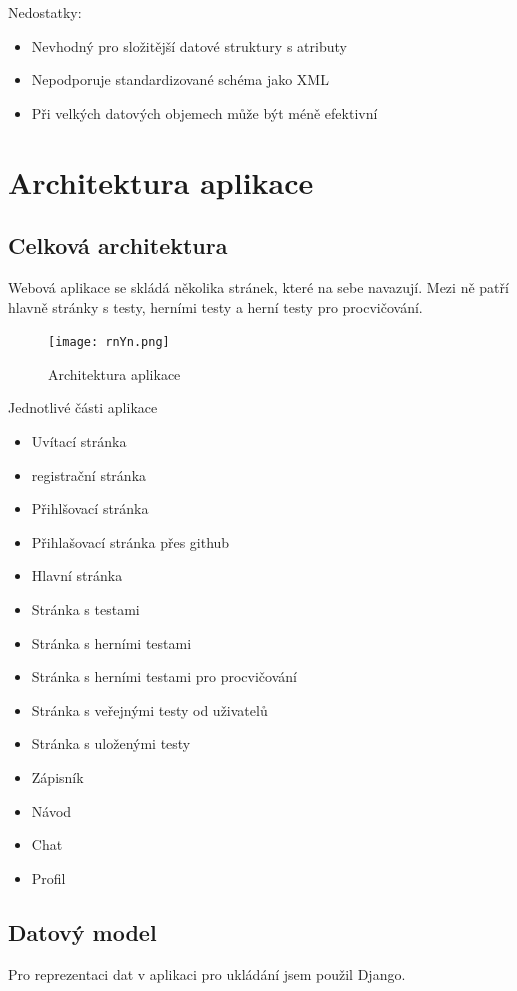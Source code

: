 \documentclass[12pt, a4paper, twoside, openright]{report}
\begin{document}
Nedostatky: 
\begin{itemize}
    \item Nevhodný pro složitější datové struktury s atributy
    \item Nepodporuje standardizované schéma jako XML
    \item Při velkých datových objemech může být méně efektivní
\end{itemize}


	

\chapter{Architektura aplikace}
	\section{Celková architektura}
	Webová aplikace se skládá několika stránek, které na sebe navazují. Mezi ně patří hlavně stránky s testy, herními testy a herní testy pro procvičování.

	\begin{figure}[h]
		\centering
		\texttt{[image: rnYn.png]}
		\caption{Architektura aplikace}
		\label{fig:architecture}
	\end{figure}

	Jednotlivé části aplikace
	\begin{itemize}
		\item Uvítací stránka
		\item registrační stránka
		\item Přihlšovací stránka
		\item Přihlašovací stránka přes github
		\item Hlavní stránka
            \item Stránka s testami
            \item Stránka s herními testami
            \item Stránka s herními testami pro procvičování
            \item Stránka s veřejnými testy od uživatelů
            \item Stránka s uloženými testy
            \item Zápisník
            \item Návod
            \item Chat
            \item Profil
	\end{itemize}

	\section{Datový model}
	Pro reprezentaci dat v aplikaci pro ukládání jsem použil Django.
\end{document}
